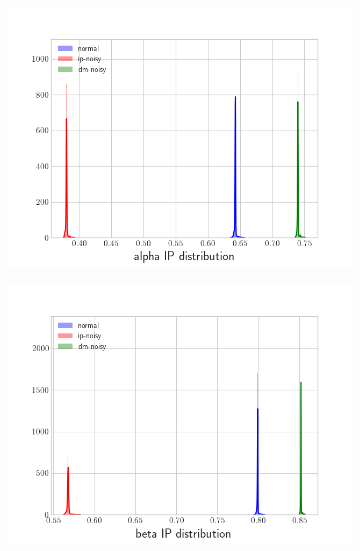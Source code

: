 \begin{figure}[!h]
\centering
\begin{subfigure}{.5\textwidth}
  \centering
  \includegraphics[width=\linewidth]{figures/alpha-distrib-low-cap}
\end{subfigure}%
\begin{subfigure}{.5\textwidth}
  \centering
  \includegraphics[width=\linewidth]{figures/beta-distrib-low-cap}
\end{subfigure}
\end{figure}


